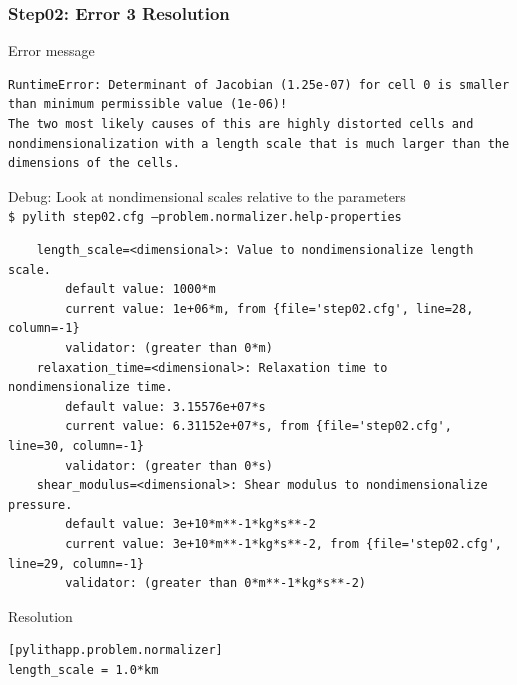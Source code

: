 \documentclass[aspectration=169]{beamer}
\newcommand{\cmd}[1]{{\footnotesize\tt \color{ltred}#1}}
\newcommand{\errlabel}[1]{{\small \color{blue}#1}}
\newcommand{\debuginfo}[1]{{\small \color{green}#1}}
\begin{document}
\begin{frame}[fragile]
  \frametitle{Step02: Error 3 Resolution}

\errlabel{Error message}
\begin{lstlisting}
RuntimeError: Determinant of Jacobian (1.25e-07) for cell 0 is smaller than minimum permissible value (1e-06)!
The two most likely causes of this are highly distorted cells and nondimensionalization with a length scale that is much larger than the dimensions of the cells.
\end{lstlisting}\pause
\errlabel{Debug:} \debuginfo{Look at nondimensional scales relative to the parameters}\\
\cmd{\$ pylith step02.cfg --problem.normalizer.help-properties}
\begin{lstlisting}
    length_scale=<dimensional>: Value to nondimensionalize length scale.
        default value: 1000*m
        current value: 1e+06*m, from {file='step02.cfg', line=28, column=-1}
        validator: (greater than 0*m)
    relaxation_time=<dimensional>: Relaxation time to nondimensionalize time.
        default value: 3.15576e+07*s
        current value: 6.31152e+07*s, from {file='step02.cfg', line=30, column=-1}
        validator: (greater than 0*s)
    shear_modulus=<dimensional>: Shear modulus to nondimensionalize pressure.
        default value: 3e+10*m**-1*kg*s**-2
        current value: 3e+10*m**-1*kg*s**-2, from {file='step02.cfg', line=29, column=-1}
        validator: (greater than 0*m**-1*kg*s**-2)
\end{lstlisting}\pause
\errlabel{Resolution}
\begin{lstlisting}
[pylithapp.problem.normalizer]
length_scale = 1.0*km
\end{lstlisting}

\end{frame}
\end{document}
